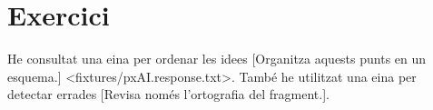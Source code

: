 \documentclass[
  CAT,AI,bibliography={fixtures/pxBibliography.references},no-cover,no-toc
]{P3CTeX}
\begin{document}
\section{Exercici}
He consultat una eina per ordenar les idees
  [Organitza aquests punts en un esquema.]
  <fixtures/pxAI.response.txt>.
També he utilitzat una eina per detectar errades
  [Revisa només l'ortografia del fragment.].
\cite{p3ctex-demo}
\end{document}
